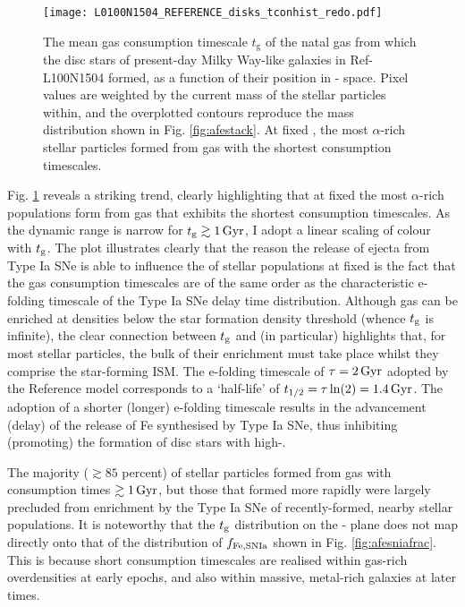 \begin{figure}
\texttt{[image: L0100N1504\_REFERENCE\_disks\_tconhist\_redo.pdf]}
\caption[Mean gas consumption timescale as a fucntion of \afe{} and \feh{} for disc stars in Ref-L100N1504]{\label{fig:afetcon} The mean gas consumption timescale $t_{\mathrm{g}}$ of the natal gas from which the disc stars of present-day Milky Way-like galaxies in Ref-L100N1504 formed, as a function of their position in \afe{}-\feh{} space.  Pixel values are weighted by the current mass of the stellar particles within, and the overplotted contours reproduce the mass distribution shown in Fig. \ref{fig:afestack}. At fixed \feh{}, the most $\alpha$-rich stellar particles formed from gas with the shortest consumption timescales.}
\end{figure}

Fig. \ref{fig:afetcon} reveals a striking trend, clearly highlighting that at fixed \feh{} the most $\alpha$-rich populations form from gas that exhibits the shortest consumption timescales. As the dynamic range is narrow for $t_{\rm g} \gtrsim 1\,{\rm Gyr}$, I adopt a linear scaling of colour with $t_{\rm g}$. The plot illustrates clearly that the reason the release of ejecta from Type Ia SNe is able to influence the \afe{} of stellar populations at fixed \feh{} is the fact that the gas consumption timescales are of the same order as the characteristic e-folding timescale of the Type Ia SNe delay time distribution. Although gas can be enriched at densities below the star formation density threshold (whence $t_{\rm g}$ is infinite), the clear connection between $t_{\rm g}$ and (in particular) \afe{} highlights that, for most stellar particles, the bulk of their enrichment must take place whilst they comprise the star-forming ISM. The e-folding timescale of $\tau=2\,{\rm Gyr}$ adopted by the Reference model corresponds to a `half-life' of $t_{1/2}=\tau\ln(2)=1.4\,{\rm Gyr}$. The adoption of a shorter (longer) e-folding timescale results in the advancement (delay) of the release of Fe synthesised by Type Ia SNe, thus inhibiting (promoting) the formation of disc stars with high-\afe{}. 

The majority ($\gtrsim 85$ percent) of stellar particles formed from gas with consumption times $\gtrsim 1\,{\rm Gyr}$, but those that formed more rapidly were largely precluded from enrichment by the Type Ia SNe of recently-formed, nearby stellar populations. It is noteworthy that the $t_{\rm g}$ distribution on the \afe{}-\feh{} plane does not map directly onto that of the distribution of $f_{\rm Fe,SNIa}$ shown in Fig. \ref{fig:afesniafrac}. This is because short consumption timescales are realised within gas-rich overdensities at early epochs, and also within massive, metal-rich galaxies at later times.

